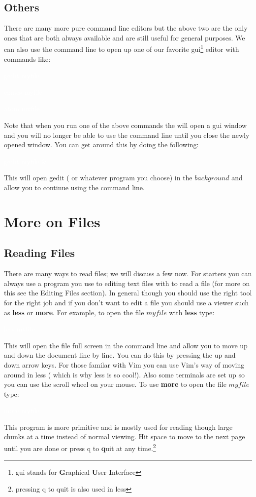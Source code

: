 \documentclass{book}
\newcommand{\commandline}[1]{\begin{center} \colorbox{Dark}{\textcolor{white}{#1}} \end{center}}
\begin{document}
\subsection{Others}
There are many more pure command line editors but the above two are the only ones that are both always available and are still useful for general purposes. We can also use the command line to open up one of our favorite gui\footnote{gui stands for \textbf{G}raphical \textbf{U}ser \textbf{I}nterface} editor with commands like: 
\commandline{gedit myfile}
\commandline{emacs myfile}
\commandline{atom myfile}
Note that when you run one of the above commands the will open a gui window and you will no longer be able to use the command line until you close the newly opened window. You can get around this by doing the following:
\commandline{gedit myfile \&}
This will open gedit ( or whatever program you choose) in the $background$ and allow you to continue using the command line. \\


\section{More on Files}

\subsection{Reading Files}
	There are many ways to read files; we will discuss a few now. For starters you can always use a program you use to editing text files with to read a file (for more on this see the Editing Files section). In general though you should use the right tool for the right job and if you don't want to edit a file you should use a viewer such as \textbf{less} or \textbf{more}.
	For example, to open the file $myfile$ with \textbf{less} type:
\commandline{less myfile}
This will open the file full screen in the command line and allow you to move up and down the document line by line. You can do this by pressing the up and down arrow keys. For those familar with Vim you can use Vim's way of moving around in less ( which is why less is so cool!). Also some terminals are set up so you can use the scroll wheel on your mouse.
To use \textbf{more} to open the file $myfile$ type:
\commandline{more myfile}
This program is more primitive and is mostly used for reading though large chunks at a time instead of normal viewing. Hit space to move to the next page until you are done or press q to \textbf{q}uit at any time.\footnote{pressing q to quit is also used in less}
\end{document}
